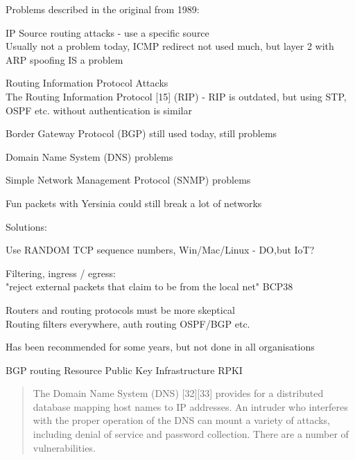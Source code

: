 \documentclass[Screen16to9,17pt]{foils}
\begin{document}

\begin{list1}
\item Problems described in the original from 1989:
\begin{list2}
\item IP Source routing attacks - use a specific source\\
Usually not a problem today, ICMP redirect not used much, but layer 2 with ARP spoofing IS a problem
\item Routing Information Protocol Attacks\\
The Routing Information Protocol [15] (RIP) - RIP is outdated, but using STP, OSPF etc. without authentication is similar
\item Border Gateway Protocol (BGP) still used today, still problems
\item Domain Name System (DNS) problems
\item Simple Network Management Protocol (SNMP) problems
\end{list2}
\vskip 1cm
\item Fun packets with Yersinia could still break a lot of networks 
\end{list1}


\begin{list1}
\item Solutions:
\begin{list2}
\item Use RANDOM TCP sequence numbers, Win/Mac/Linux - DO,but IoT?
\item Filtering, ingress / egress:\\
"reject external packets that claim to be from the local net" BCP38
\item Routers and routing protocols must be more skeptical\\
Routing filters everywhere, auth routing OSPF/BGP etc.
\end{list2}
\item Has been recommended for some years, but not done in all organisations
\item BGP routing Resource Public Key Infrastructure RPKI
\end{list1}


\begin{quote}
The Domain Name System (DNS) [32][33] provides for a distributed database mapping host names to IP
addresses. An intruder who interferes with the proper operation of the DNS can mount a variety of
attacks, including denial of service and password collection. There are a number of vulnerabilities.
\end{quote}
\end{document}
